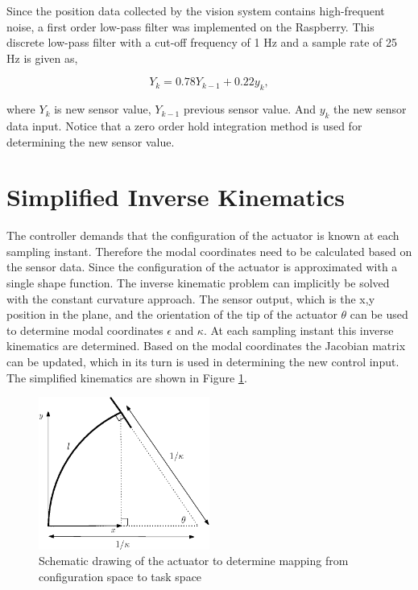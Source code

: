 Since the position data collected by the vision system contains high-frequent noise, a first order low-pass filter was implemented on the Raspberry. This discrete low-pass filter with a cut-off frequency of 1 Hz and a sample rate of 25 Hz is given as,

\begin{equation}
    Y_k = 0.78Y_{k-1} + 0.22y_k,
\end{equation}

where $Y_k$ is new sensor value, $Y_{k-1}$ previous sensor value. And $y_k$ the new sensor data input. Notice that a zero order hold integration method is used for determining the new sensor value. 




\section{Simplified Inverse Kinematics}

The controller demands that the configuration of the actuator is known at each sampling instant. Therefore the modal coordinates need to be calculated based on the sensor data. Since the configuration of the actuator is approximated with a single shape function. The inverse kinematic problem can implicitly be solved with the constant curvature approach. The sensor output, which is the x,y position in the plane, and the orientation of the tip of the actuator $\theta$ can be used to determine modal coordinates $\epsilon$ and $\kappa$. At each sampling instant this inverse kinematics are determined. Based on the modal coordinates the Jacobian matrix can be updated, which in its turn is used in determining the new control input. The simplified kinematics are shown in Figure \ref{fig:simpkin}.

\begin{figure}[H]
    \centering
    \includegraphics[width = 0.5\textwidth]{Figures/Chapter5/fbdkinematics.eps}
    \caption{Schematic drawing of the actuator to determine mapping from configuration space to task space}
    \label{fig:simpkin}
\end{figure}

